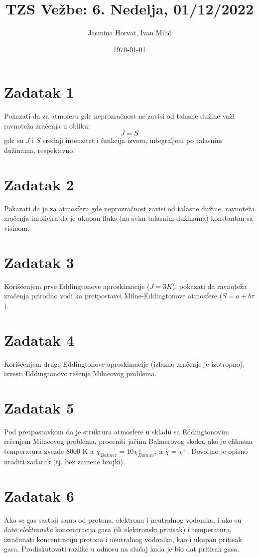 \documentclass[12pt]{article}
\title{TZS Ve\v{z}be: 6. Nedelja, 01/12/2022}
\author{Jasmina Horvat, Ivan Mili\'{c}}
\date{\today}
\begin{document}
\maketitle

\section{Zadatak 1}
Pokazati da za atmoferu gde neprozra\v{c}nost ne zavisi od talasne du\v{z}ine va\v{z}i ravnote\v{z}a zra\v{c}enja u obliku:
\begin{equation}
J = S 
\end{equation}
gde su $J$ i $S$ srednji intenzitet i funkcija izvora, integraljeni po talasnim du\v{z}inama, respektivno. 

\section{Zadatak 2}
Pokazati da je za atmosferu gde neprozra\v{c}nost zavisi od talasne du\v{z}ine, ravnote\v{z}a zra\v{c}enja implicira da je ukupan fluks (na svim talasnim du\v{z}inama) konstantan sa visinom. 

\section{Zadatak 3}
Kori\v{s}\'{c}enjem prve Eddingtonove aproskimacije ($J = 3K$), pokazati da ravnote\v{z}a zra\v{c}enja prirodno vodi ka pretpostavci Milne-Eddingtonove atmosfere ($S = a+b \tau$).

\section{Zadatak 4}
Kori\v{s}\'{c}enjem druge Eddingtonove aproskimacije (izlazno zra\v{c}enje je izotropno), izvesti Eddingtonovo re\v{s}enje Milneovog problema. 

\section{Zadatak 5}
Pod pretpostavkom da je struktura atmosfere u skladu sa Eddingtonovim re\v{s}enjem Milneovog problema, proceniti ja\v{c}inu Balmerovog skoka, ako je efikasna temperatura zvezde 8000 K a $\chi^-_{Balmer} = 10 \chi^+_{Balmer}$, a $\overline{\chi} = \chi^+$. Dovoljno je opisno uraditi zadatak (tj. bez zamene brojki).

\section{Zadatak 6}
Ako se gas sastoji samo od protona, elektrona i neutralnog vodonika, i ako su date \emph{elektronska} koncentracija gasa (ili elektronski pritisak) i temperatura, izra\v{c}unati koncentraciju protona i neutralnog vodonika, kao i ukupan pritisak gasa. Prodiskutovati razlike u odnosu na slu\v{c}aj kada je bio dat pritisak gasa. 
\end{document}

